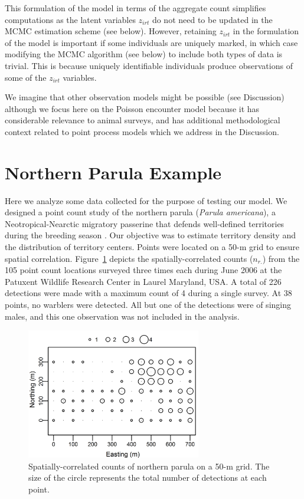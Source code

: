 This formulation of the model in terms of the aggregate count
simplifies computations as the latent variables
$z_{irt}$ do not need to be updated in the MCMC estimation
scheme (see below). However, retaining $z_{irt}$
in the formulation of the model
is important if some individuals are uniquely marked, in which case
modifying
the MCMC algorithm (see below) to include both types of data is
trivial. This is because uniquely identifiable individuals produce
observations of some of the $z_{irt}$ variables.




We imagine that other observation models
might be possible (see Discussion) although we focus here on the
Poisson encounter model because it has considerable relevance to
animal surveys, and has additional methodological context related to
point process models which we address in the Discussion.







\section{Northern Parula Example}

Here we analyze some data collected for the purpose of testing our
model. We designed a point
count study of the northern parula ({\it Parula americana}), a
Neotropical-Nearctic migratory passerine that defends
well-defined territories during the breeding season
\citep{moldenhaer_regelski:1996}. Our objective was to
estimate territory density and the distribution of territory centers. Points
were located on a 50-m grid to ensure spatial
correlation. Figure~\ref{fig:nopaDat} depicts the spatially-correlated
counts ($n_{r.}$) from the 105 point count locations
surveyed three times each during June 2006
at the Patuxent Wildlife Research Center in Laurel Maryland, USA.
A total of 226 detections were made with a maximum count of 4 during a
single survey. At 38 points, no warblers were detected. All but one of
the detections were of singing males, and this one observation was
not included in the analysis.


\begin{figure}
  \centering
  \includegraphics[width=3in,height=2.25in]{Ch14/figs/nopa}
  \caption{Spatially-correlated counts of northern parula on a 50-m
    grid. The size of the circle represents the total number of
    detections at each point.}
  \label{fig:nopaDat}
\end{figure}



